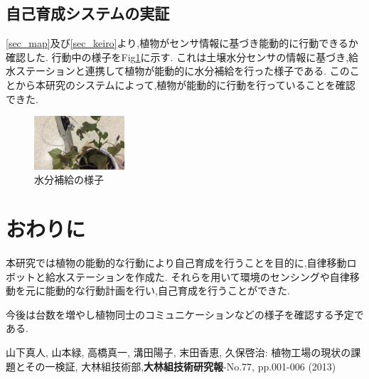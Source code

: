 \documentclass[10pt]{jsarticle}
\begin{document}
\subsection{自己育成システムの実証}
\ref{sec_map}及び\ref{sec_keiro}より,植物がセンサ情報に基づき能動的に行動できるか確認した.
行動中の様子をFig\ref{mizu}に示す.
これは土壌水分センサの情報に基づき,給水ステーションと連携して植物が能動的に水分補給を行った様子である.
このことから本研究のシステムによって,植物が能動的に行動を行っていることを確認できた.
\begin{figure}[t]
    \centering
    \includegraphics[width=0.3\textwidth]{img/mizu.png}
    \caption{水分補給の様子}
    \label{mizu}
\end{figure}

\section{おわりに}
本研究では植物の能動的な行動により自己育成を行うことを目的に,自律移動ロボットと給水ステーションを作成た.
それらを用いて環境のセンシングや自律移動を元に能動的な行動計画を行い,自己育成を行うことができた.

今後は台数を増やし植物同士のコミュニケーションなどの様子を確認する予定である.

\begin{thebibliography}{10}

山下真人, 山本緑, 高橋真一, 溝田陽子, 末田香恵, 久保啓治: 植物工場の現状の課題とその一検証,
大林組技術部,{\bf 大林組技術研究報}-No.77, pp.001-006 (2013)
\end{thebibliography}
\end{document}
